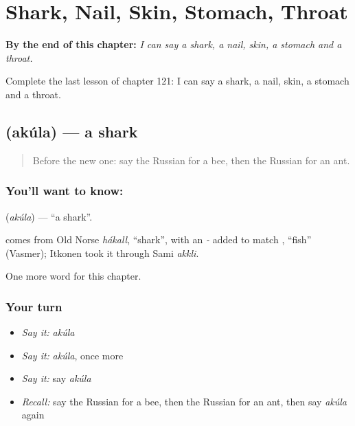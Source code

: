 
\chapter{Shark, Nail, Skin, Stomach, Throat}
\label{ch:ru-shark-nail-skin-stomach-throat}

\begin{chapteropening}
\textbf{By the end of this chapter:} \emph{I can say a shark, a nail, skin, a stomach and a throat.}

Complete the last lesson of chapter 121: I can say a shark, a nail, skin, a stomach and a throat.
\end{chapteropening}

\section[\texorpdfstring{\ru{акула} (akúla)}{акула (akúla)}]{ (akúla) — a shark}

\label{lesson:RU-C121-shark}



\begin{quote}
Before the new one: say the Russian for a bee, then the Russian for an ant.
\end{quote}

\subsection*{You'll want to know: }
\textbf{} (\emph{akúla}) — \textquotedblleft{}a shark\textquotedblright{}.

\begin{cousinweb}
\textbf{} comes from Old Norse \emph{hákall}, \textquotedblleft{}shark\textquotedblright{}, with an \emph{-} added to match \emph{}, \textquotedblleft{}fish\textquotedblright{} (Vasmer); Itkonen took it through Sami \emph{akkli}.
\end{cousinweb}

\begin{grammarlens}[title={What you've built}]
One more word for this chapter.
\end{grammarlens}

\subsection*{Your turn}
\begin{itemize}
\raggedright
  \item \emph{Say it:} \emph{akúla}
  \item \emph{Say it:} \emph{akúla}, once more
  \item \emph{Say it:} say \emph{akúla}
  \item \emph{Recall:} say the Russian for a bee, then the Russian for an ant, then say \emph{akúla} again
\end{itemize}

